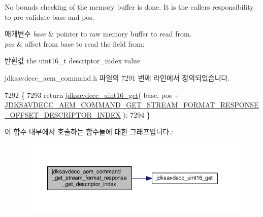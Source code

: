 No bounds checking of the memory buffer is done. It is the caller\textquotesingle{}s responsibility to pre-\/validate base and pos.


\begin{DoxyParams}{매개변수}
{\em base} & pointer to raw memory buffer to read from. \\
\hline
{\em pos} & offset from base to read the field from; \\
\hline
\end{DoxyParams}
\begin{DoxyReturn}{반환값}
the uint16\+\_\+t descriptor\+\_\+index value 
\end{DoxyReturn}


jdksavdecc\+\_\+aem\+\_\+command.\+h 파일의 7291 번째 라인에서 정의되었습니다.


\begin{DoxyCode}
7292 \{
7293     \textcolor{keywordflow}{return} \hyperlink{group__endian_ga3fbbbc20be954aa61e039872965b0dc9}{jdksavdecc\_uint16\_get}( base, pos + 
      \hyperlink{group__command__get__stream__format__response_ga04b7057e5f45634c94b3c5d346950068}{JDKSAVDECC\_AEM\_COMMAND\_GET\_STREAM\_FORMAT\_RESPONSE\_OFFSET\_DESCRIPTOR\_INDEX}
       );
7294 \}
\end{DoxyCode}


이 함수 내부에서 호출하는 함수들에 대한 그래프입니다.\+:
\nopagebreak
\begin{figure}[H]
\begin{center}
\leavevmode
\includegraphics[width=350pt]{group__command__get__stream__format__response_ga7563eab7dd358577f64f660404bed6c9_cgraph}
\end{center}
\end{figure}




